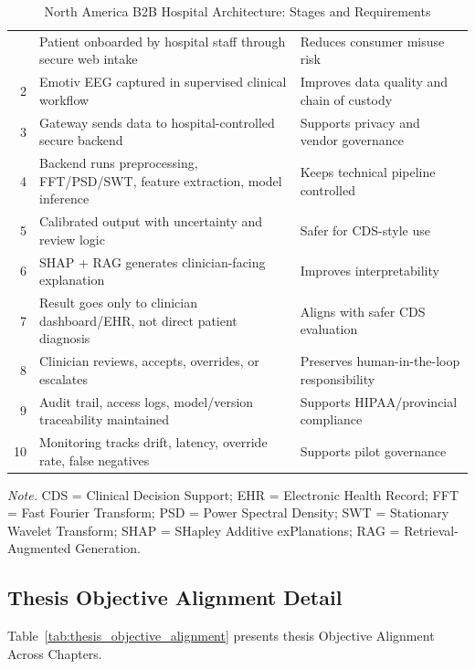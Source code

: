 {\tablestripes\tablefontsize
{}
\begin{xltabular}{\textwidth}{@{} r L L @{}}
\caption[North America B2B Hospital Architecture]{North America B2B Hospital Architecture: Stages and Requirements}\label{tab:b2b_hospital_architecture} \\
\toprule
\thead{\#} &  &  \\
\midrule
\endfirsthead
\endhead
\bottomrule
{} & Patient onboarded by hospital staff through secure web intake & Reduces consumer misuse risk \\
2 & Emotiv EEG captured in supervised clinical workflow & Improves data quality and chain of custody \\
3 & Gateway sends data to hospital-controlled secure backend & Supports privacy and vendor governance \\
4 & Backend runs preprocessing, FFT/PSD/SWT, feature extraction, model inference & Keeps technical pipeline controlled \\
5 & Calibrated output with uncertainty and review logic & Safer for CDS-style use \\
6 & SHAP + RAG generates clinician-facing explanation & Improves interpretability \\
7 & Result goes only to clinician dashboard/EHR, not direct patient diagnosis & Aligns with safer CDS evaluation \\
8 & Clinician reviews, accepts, overrides, or escalates & Preserves human-in-the-loop responsibility \\
9 & Audit trail, access logs, model/version traceability maintained & Supports HIPAA/provincial compliance \\
10 & Monitoring tracks drift, latency, override rate, false negatives & Supports pilot governance \\
\end{xltabular}}
\vspace{2pt}
\noindent\textit{Note.} CDS = Clinical Decision Support; EHR = Electronic Health Record; FFT = Fast Fourier Transform; PSD = Power Spectral Density; SWT = Stationary Wavelet Transform; SHAP = SHapley Additive exPlanations; RAG = Retrieval-Augmented Generation.

\subsection{Thesis Objective Alignment Detail}\label{sec:appendix_ch3_thesis_objective_alignment}
\begingroup\tablefontsize
\noindent Table~\ref{tab:thesis_objective_alignment} presents thesis Objective Alignment Across Chapters.


